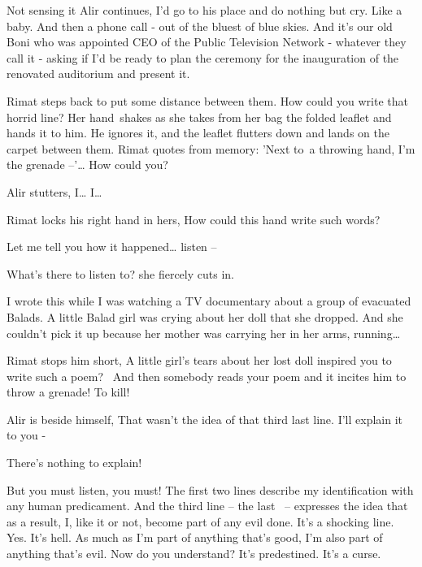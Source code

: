 \documentclass[letterpaper]{article}
\begin{document}
Not sensing it Alir continues, {\textquotedbl}I'd go to his place and do nothing but cry. Like a baby. And then a phone
call - out of the bluest of blue skies. And it's our old Boni who was appointed CEO of the Public Television Network -
whatever they call it - asking if I'd be ready to plan the ceremony for the inauguration of the renovated auditorium
and present it.{\textquotedbl} 

Rimat steps back to put some distance between them. {\textquotedbl}How could you write that horrid line?{\textquotedbl}
Her hand~shakes as she takes from her bag the folded leaflet and hands it to him. He ignores it, and the leaflet
flutters down and lands on the carpet between them. Rimat quotes from memory: {\textquotedbl}'Next to~a throwing hand,
I'm the grenade --'{\dots} How could you?{\textquotedbl} 

Alir stutters, {\textquotedbl}I{\dots} I{\dots}{\textquotedbl} 

Rimat locks his right hand in hers, {\textquotedbl}How could this hand write such words?{\textquotedbl} 

{\textquotedbl}Let me tell you how it happened{\dots} listen -- {\textquotedbl} 

{\textquotedbl}What's there to listen to?{\textquotedbl} she fiercely cuts in.

{\textquotedbl}I wrote this while I was watching a TV documentary about a group of evacuated Balads. A little Balad girl
was crying about her doll that she dropped. And she couldn't pick it up because her mother was carrying her in her
arms, running{\dots}{\textquotedbl} 

Rimat stops him short, {\textquotedbl}A little girl's tears about her lost doll inspired you to write such a poem?~ And
then somebody reads your poem and it incites him to throw a grenade! To kill!{\textquotedbl} 

Alir is beside himself, {\textquotedbl}That wasn't the idea of that third last line. I'll explain it to you
-{\textquotedbl} 

{\textquotedbl}There's nothing to explain!{\textquotedbl} 

{\textquotedbl}But you must listen, you must! The first two lines describe my identification with any human predicament.
And the third line -- the last \ {}-- expresses the idea that as a result, I, like it or not, become part of any evil
done. It's a shocking line. Yes. It's hell. As much as I'm part of anything that's good, I'm also part of anything
that's evil. Now do you understand? It's predestined. It's a curse.{\textquotedbl} 
\end{document}
